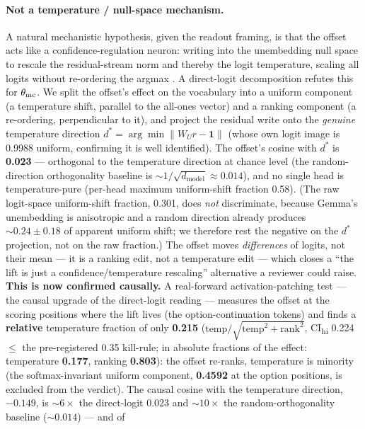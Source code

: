 \paragraph{Not a temperature / null-space mechanism.}
A natural mechanistic hypothesis, given the readout framing, is that the offset
acts like a confidence-regulation neuron: writing into the unembedding null space
to rescale the residual-stream norm and thereby the logit temperature, scaling all
logits without re-ordering the argmax \citep{ConfidenceRegulationNeurons}. A
direct-logit decomposition refutes this for $\theta_{\mathrm{mc}}$. We split the offset's
effect on the vocabulary into a uniform component (a temperature shift, parallel to
the all-ones vector) and a ranking component (a re-ordering, perpendicular to it),
and project the residual write onto the \emph{genuine} temperature direction
$d^{*} = \arg\min\|W_U r - \mathbf{1}\|$ (whose own logit image is 0.9988 uniform,
confirming it is well identified). The offset's cosine with $d^{*}$ is
\textbf{0.023} --- orthogonal to the temperature direction at chance level (the
random-direction orthogonality baseline is
${\sim}1/\sqrt{d_{\mathrm{model}}} \approx 0.014$), and no single head is
temperature-pure (per-head maximum uniform-shift fraction 0.58). (The raw
logit-space uniform-shift fraction, 0.301, does \emph{not} discriminate, because
Gemma's unembedding is anisotropic and a random direction already produces
${\sim}0.24 \pm 0.18$ of apparent uniform shift; we therefore rest the negative on
the $d^{*}$ projection, not on the raw fraction.) The offset moves
\emph{differences} of logits, not their mean --- it is a ranking edit, not a
temperature edit --- which closes a ``the lift is just a confidence/temperature
rescaling'' alternative a reviewer could raise. \textbf{This is now confirmed
causally.} A real-forward activation-patching test --- the causal upgrade of the
direct-logit reading --- measures the offset at the scoring positions where the
lift lives (the option-continuation tokens) and finds a \textbf{relative}
temperature fraction of only \textbf{0.215}
($\mathrm{temp}/\sqrt{\mathrm{temp}^2+\mathrm{rank}^2}$, CI\textsubscript{hi}
0.224 ${\leq}$ the pre-registered 0.35 kill-rule; in absolute fractions of the
effect: temperature \textbf{0.177}, ranking \textbf{0.803}): the offset re-ranks,
temperature is minority (the softmax-invariant uniform component, \textbf{0.4592}
at the option positions, is excluded from the verdict). The causal cosine with the
temperature direction, $-0.149$, is ${\sim}6\times$ the direct-logit 0.023 and
${\sim}10\times$ the random-orthogonality baseline (${\sim}0.014$) --- and of
